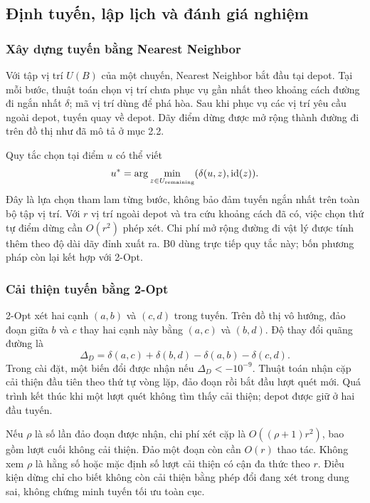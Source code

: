 \subsection{Định tuyến, lập lịch và đánh giá nghiệm}

\subsubsection{Xây dựng tuyến bằng Nearest Neighbor}
Với tập vị trí $U(B)$ của một chuyến, Nearest Neighbor bắt đầu tại depot. Tại mỗi bước, thuật toán chọn vị trí chưa phục vụ gần nhất theo khoảng cách đường đi ngắn nhất $\delta$; mã vị trí dùng để phá hòa. Sau khi phục vụ các vị trí yêu cầu ngoài depot, tuyến quay về depot. Dãy điểm dừng được mở rộng thành đường đi trên đồ thị như đã mô tả ở mục 2.2.

Quy tắc chọn tại điểm $u$ có thể viết
\begin{equation}
 u^*=\arg\min_{z\in U_{\rm remaining}}(\delta(u,z),\operatorname{id}(z)).\label{eq:nn-choice}
\end{equation}
Đây là lựa chọn tham lam từng bước, không bảo đảm tuyến ngắn nhất trên toàn bộ tập vị trí. Với $r$ vị trí ngoài depot và tra cứu khoảng cách đã có, việc chọn thứ tự điểm dừng cần $O(r^2)$ phép xét. Chi phí mở rộng đường đi vật lý được tính thêm theo độ dài dãy đỉnh xuất ra. B0 dùng trực tiếp quy tắc này; bốn phương pháp còn lại kết hợp với 2-Opt.

\subsubsection{Cải thiện tuyến bằng 2-Opt}
2-Opt xét hai cạnh $(a,b)$ và $(c,d)$ trong tuyến. Trên đồ thị vô hướng, đảo đoạn giữa $b$ và $c$ thay hai cạnh này bằng $(a,c)$ và $(b,d)$. Độ thay đổi quãng đường là
\begin{equation}
 \Delta_D=\delta(a,c)+\delta(b,d)-\delta(a,b)-\delta(c,d).\label{eq:two-opt-delta}
\end{equation}
Trong cài đặt, một biến đổi được nhận nếu $\Delta_D<-10^{-9}$. Thuật toán nhận cặp cải thiện đầu tiên theo thứ tự vòng lặp, đảo đoạn rồi bắt đầu lượt quét mới. Quá trình kết thúc khi một lượt quét không tìm thấy cải thiện; depot được giữ ở hai đầu tuyến.

Nếu $\rho$ là số lần đảo đoạn được nhận, chi phí xét cặp là $O((\rho+1)r^2)$, bao gồm lượt cuối không cải thiện. Đảo một đoạn còn cần $O(r)$ thao tác. Không xem $\rho$ là hằng số hoặc mặc định số lượt cải thiện có cận đa thức theo $r$. Điều kiện dừng chỉ cho biết không còn cải thiện bằng phép đổi đang xét trong dung sai, không chứng minh tuyến tối ưu toàn cục.

